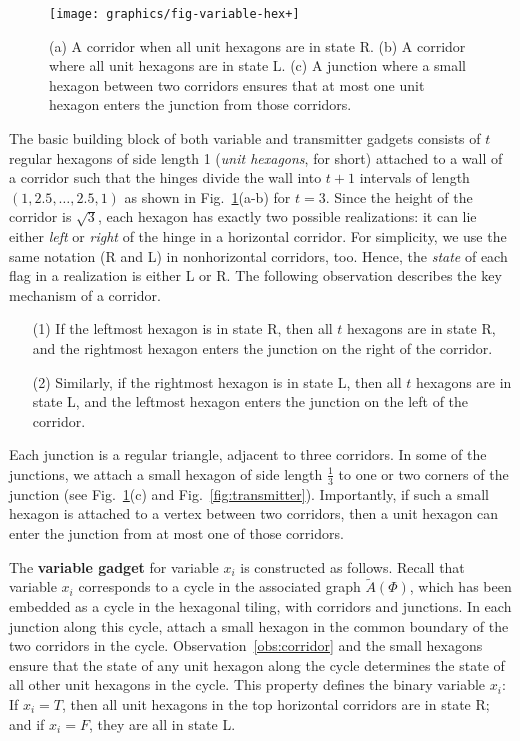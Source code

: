 \begin{figure}[htbp]
	\centering
	\texttt{[image: graphics/fig-variable-hex+]}
	\caption{(a) A corridor when all unit hexagons are in state R.
(b) A corridor where all unit hexagons are in state L.
(c) A junction where a small hexagon between two corridors
    ensures that at most one unit hexagon enters the junction from those corridors.}
	\label{fig:variable}
\end{figure}

The basic building block of both variable and transmitter gadgets consists of $t$ regular hexagons of side length 1 (\emph{unit hexagons}, for short) attached to a wall of a corridor such that the hinges divide the wall into $t+1$ intervals of length $(1,2.5,\ldots ,2.5,1)$ as shown in Fig.~\ref{fig:variable}(a-b) for $t=3$. Since the height of the corridor is $\sqrt{3}$, each hexagon has exactly two possible realizations: it can lie either \emph{left} or \emph{right} of the hinge in a horizontal corridor. For simplicity, we use the same notation (R and L) in nonhorizontal corridors, too. Hence, the \emph{state} of each flag in a realization is either L or R. The following observation describes the key mechanism of a corridor.

\begin{observation}\label{obs:corridor}
\begin{itemize}
\item[]
\item[(1)] If the leftmost hexagon is in state R, then all $t$ hexagons are in state R, and the rightmost hexagon enters the junction on the right of the corridor.
\item[(2)] Similarly, if the rightmost hexagon is in state L, then all $t$ hexagons are in state L, and the leftmost hexagon enters the junction on the left of the corridor.
\end{itemize}
\end{observation}

Each junction is a regular triangle, adjacent to three corridors. In some of the junctions, we attach a small hexagon of side length $\frac{1}{3}$ to one or two corners of the junction (see Fig.~\ref{fig:variable}(c) and Fig.~\ref{fig:transmitter}). Importantly, if such a small hexagon is attached to a vertex between two corridors, then a unit hexagon can enter the junction from at most one of those corridors.

The {\bf variable gadget} for variable $x_i$ is constructed as follows. Recall that variable $x_i$ corresponds to a cycle in the associated graph $\tilde{A}(\Phi)$, which has been embedded as a cycle in the hexagonal tiling, with corridors and junctions. In each junction along this cycle, attach a small hexagon in the common boundary of the two corridors in the cycle. Observation~\ref{obs:corridor} and the small hexagons ensure that the state of any unit hexagon along the cycle determines the state of all other unit hexagons in the cycle. This property defines the binary variable $x_i$: If $x_i=T$, then all unit hexagons in the top horizontal corridors are in state R; and if $x_i=F$, they are all in state L.

